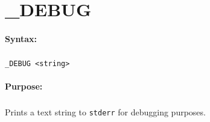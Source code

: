 
\newpage
\section{\_DEBUG}
\label{cmd:_DEBUG}

\paragraph{Syntax:}
\subparagraph{}
\texttt{\_DEBUG <string>}

\paragraph{Purpose:}
\subparagraph{}
Prints a text string to \texttt{stderr} for debugging purposes.
